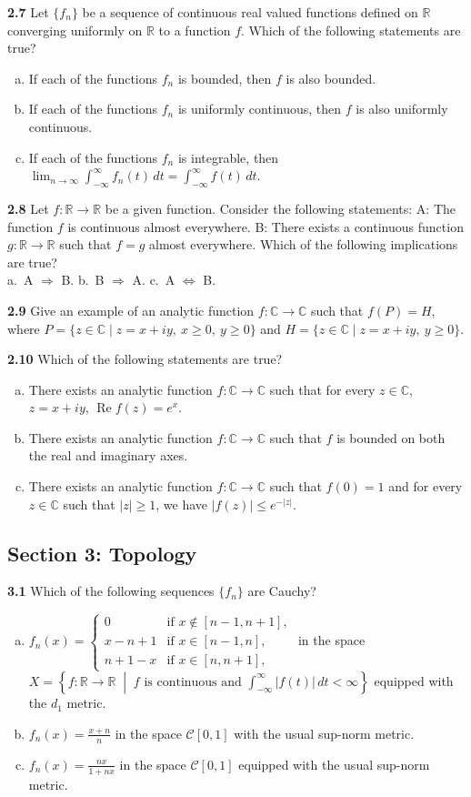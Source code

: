 \documentclass[11pt,a4paper]{article}
\newcommand{\R}{\mathbb{R}}
\newcommand{\C}{\mathbb{C}}
\newcommand{\RePart}{\operatorname{Re}}
\newcommand{\examsec}[1]{%
  \subsection*{#1}
  \vspace{-2pt}
}
\newcommand{\qitem}[1]{\par\medskip\noindent\textbf{#1}\hspace{0.5em}}
\begin{document}
\qitem{2.7} Let $\{f_n\}$ be a sequence of continuous real valued functions defined on $\R$ converging uniformly on $\R$ to a function $f$. Which of the following statements are true?
\begin{enumerate}[a.]
  \item If each of the functions $f_n$ is bounded, then $f$ is also bounded.
  \item If each of the functions $f_n$ is uniformly continuous, then $f$ is also uniformly continuous.
  \item If each of the functions $f_n$ is integrable, then $\lim_{n \to \infty} \int_{-\infty}^{\infty} f_n(t)\,dt = \int_{-\infty}^{\infty} f(t)\,dt$.
\end{enumerate}

\qitem{2.8} Let $f : \R \to \R$ be a given function. Consider the following statements: A: The function $f$ is continuous almost everywhere. B: There exists a continuous function $g : \R \to \R$ such that $f = g$ almost everywhere. Which of the following implications are true?\\
a.\ A $\Rightarrow$ B. \qquad b.\ B $\Rightarrow$ A. \qquad c.\ A $\Leftrightarrow$ B.

\qitem{2.9} Give an example of an analytic function $f : \C \to \C$ such that $f(P) = H$, where $P = \{z \in \C \mid z = x + iy,\ x \ge 0,\ y \ge 0\}$ and $H = \{z \in \C \mid z = x + iy,\ y \ge 0\}$.

\qitem{2.10} Which of the following statements are true?
\begin{enumerate}[a.]
  \item There exists an analytic function $f : \C \to \C$ such that for every $z \in \C$, $z = x + iy$, $\RePart f(z) = e^x$.
  \item There exists an analytic function $f : \C \to \C$ such that $f$ is bounded on both the real and imaginary axes.
  \item There exists an analytic function $f : \C \to \C$ such that $f(0) = 1$ and for every $z \in \C$ such that $|z| \ge 1$, we have $|f(z)| \le e^{-|z|}$.
\end{enumerate}

\examsec{Section 3: Topology}

\qitem{3.1} Which of the following sequences $\{f_n\}$ are Cauchy?
\begin{enumerate}[a.]
  \item $f_n(x) = \begin{cases} 0 & \text{if } x \notin [n-1, n+1], \\ x - n + 1 & \text{if } x \in [n-1, n], \\ n + 1 - x & \text{if } x \in [n, n+1], \end{cases}$ in the space $X = \left\{f : \R \to \R \;\middle|\; f \text{ is continuous and } \int_{-\infty}^{\infty} |f(t)|\,dt < \infty\right\}$ equipped with the $d_1$ metric.
  \item $f_n(x) = \frac{x+n}{n}$ in the space $\mathcal{C}[0, 1]$ with the usual sup-norm metric.
  \item $f_n(x) = \frac{nx}{1+nx}$ in the space $\mathcal{C}[0, 1]$ equipped with the usual sup-norm metric.
\end{enumerate}
\end{document}
